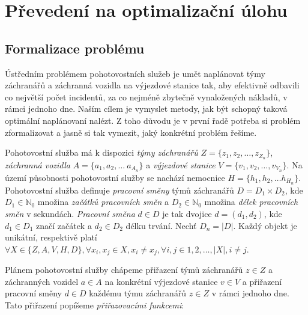 \chapter{Převedení na optimalizační úlohu}

\section{Formalizace problému}

Ústředním problémem pohotovostních služeb je umět naplánovat týmy záchranářů a záchranná vozidla na výjezdové stanice tak, aby efektivně odbavili co největší počet incidentů,
za co nejméně zbytečně vynaložených nákladů, v rámci jednoho dne.
Naším cílem je vymyslet metody, jak být schopný taková optimální naplánovaní nalézt.
Z toho důvodu je v první řadě potřeba si problém zformalizovat a jasně si tak vymezit, jaký konkrétní problém řešíme.

Pohotovostní služba má k dispozici \textit{týmy záchranářů} $Z = \{ z_1, z_2, \dots, z_{Z_n} \}$, \textit{záchranná vozidla} $A = \{ a_1, a_2, \dots\ a_{A_n} \}$
a \textit{výjezdové stanice} $V = \{ v_1, v_2, \dots, v_{V_n} \}$. 
Na území působnosti pohotovostní služby se nachází nemocnice $H = \{ h_1, h_2, \dots h_{H_n} \}$.
Pohotovostní služba definuje \textit{pracovní směny} týmů záchranářů $D = D_{1} \times D_{2}$, 
kde $D_{1} \in \mathbb{N}_0$ množina \textit{začátků pracovních směn} a $D_{2} \in \mathbb{N}_0$ množina \textit{délek pracovních směn} v sekundách.
\textit{Pracovní směna} $d \in D$ je tak dvojice $d = (d_1, d_2)$, kde $d_{1} \in D_{1}$ značí začátek a $d_{2} \in D_{2}$ délku trvání.
Nechť $D_n = |D|$.
Každý objekt je unikátní, respektivě platí $\forall X \in \{ Z, A, V, H, D\}, \forall x_i, x_j \in X, x_i \neq x_j, \forall i,j \in {1, 2, \dots, |X|}, i \neq j$.

Plánem pohotovostní služby chápeme přiřazení týmů záchranářů $z \in Z$ a záchranných vozidel $a \in A$ na konkrétní výjezdové stanice $v \in V$
a přiřazení pracovní směny $d \in D$ každému týmu záchranářů $z \in Z$ v rámci jednoho dne.
Tato přiřazení popíšeme \textit{přiřazovacími funkcemi}:

